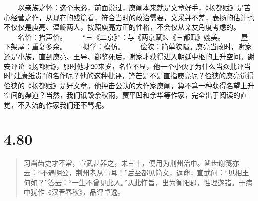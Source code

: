 \documentclass[]{book}
\begin{document}
　　以亲族之怀：这个未必，前面说过，庾阐本来就是文章好手，《扬都赋》是苦心经营之作，从现存的残篇看，符合当时的政治需要，文采并不差，表扬的估计也不仅仅是庾亮、温峤两人，按照庾亮方正的性格，不会仅从亲友角度考虑的。
　　名价：抬声价。 　　``三《二京》''：与《两京赋》、《三都赋》媲美。
　　屋下架屋：重复多余。 　　拟学：模仿。
　　俭狭：简单狭隘。庾亮当政时，谢家还是小族，直到庾亮、王导、郗鉴死后，谢家才获得进入朝廷中枢的上升空间。谢安评论《扬都赋》，那时他才20来岁，名位不显，他一个小伙子为什么当众批评当时``建康纸贵''的名作呢？他的这种批评，锋芒是不是直指庾亮呢？俭狭的庾亮觉得俭狭的《扬都赋》是好文章。他抨击公认的大作家庾阐，算不算一种获得名望上升空间的渠道？当然，我们诋毁余秋雨，贾平凹和余华等作家，完全出于阅读的直觉，不入流的作家我们还不骂呢。

\section{4.80}\label{section-257}

\begin{quote}
习凿齿史才不常，宣武甚器之，未三十，便用为荆州治中。凿齿谢笺亦云：``不遇明公，荆州老从事耳！''后至都见简文，返命，宣武问：``见相王何如？''答云：``一生不曾见此人。''从此忤旨，出为衡阳郡，性理遂错。于病中犹作《汉晋春秋》，品评卓逸。
\end{quote}
\end{document}
